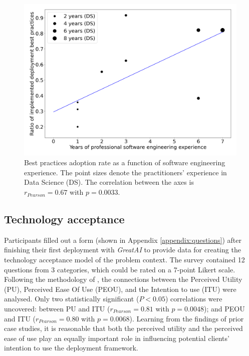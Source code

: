\begin{figure}
    \centering
    \includegraphics[width=0.7\linewidth]{figures/best-practices.png}
    \captionsetup{width=.9\linewidth}
    \caption{Best practices adoption rate as a function of software engineering experience. The point sizes denote the practitioners' experience in Data Science (DS). The correlation between the axes is $r_{Pearson} = 0.67$ with $p = 0.0033$.}
    \label{fig:adoption}
\end{figure}

\subsection{Technology acceptance}

Participants filled out a form (shown in Appendix \ref{appendix:questions}) after finishing their first deployment with \textit{GreatAI} to provide data for creating the technology acceptance model of the problem context. The survey contained 12 questions from 3 categories, which could be rated on a 7-point Likert scale. Following the methodology of \cite{cruz2019catalog}, the connections between the Perceived Utility (PU), Perceived Ease Of Use (PEOU), and the Intention to use (ITU) were analysed. Only two statistically significant ($P < 0.05$) correlations were uncovered: between PU and ITU ($r_{Pearson} = 0.81$ with $p = 0.0048$); and PEOU and ITU ($r_{Pearson} = 0.80$ with $p = 0.0068$). Learning from the findings of prior case studies, it is reasonable that both the perceived utility and the perceived ease of use play an equally important role in influencing potential clients' intention to use the deployment framework. 

